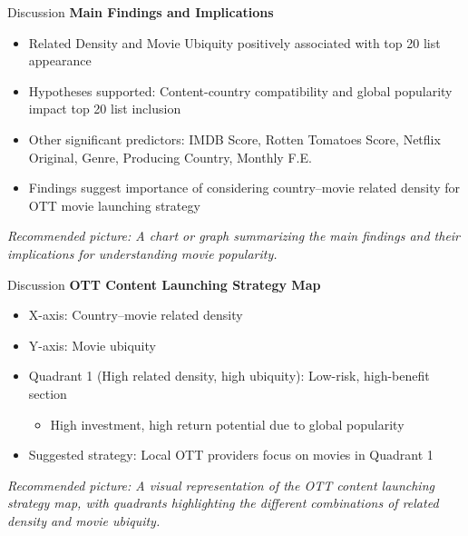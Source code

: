 \documentclass[
  ignorenonframetext,
]{beamer}
\providecommand{\tightlist}{%
  \setlength{\itemsep}{0pt}\setlength{\parskip}{0pt}}\usepackage{longtable,booktabs,array}
\begin{document}
\begin{frame}{Discussion}
\protect\hypertarget{discussion-1}{}
\textbf{Main Findings and Implications}

\begin{itemize}
\item
  Related Density and Movie Ubiquity positively associated with top 20
  list appearance
\item
  Hypotheses supported: Content-country compatibility and global
  popularity impact top 20 list inclusion
\item
  Other significant predictors: IMDB Score, Rotten Tomatoes Score,
  Netflix Original, Genre, Producing Country, Monthly F.E.
\item
  Findings suggest importance of considering country--movie related
  density for OTT movie launching strategy
\end{itemize}

\emph{Recommended picture: A chart or graph summarizing the main
findings and their implications for understanding movie popularity.}
\end{frame}

\begin{frame}{Discussion}
\protect\hypertarget{discussion-2}{}
\textbf{OTT Content Launching Strategy Map}

\begin{itemize}
\item
  X-axis: Country--movie related density
\item
  Y-axis: Movie ubiquity
\item
  Quadrant 1 (High related density, high ubiquity): Low-risk,
  high-benefit section

  \begin{itemize}
  \tightlist
  \item
    High investment, high return potential due to global popularity
  \end{itemize}
\item
  Suggested strategy: Local OTT providers focus on movies in Quadrant 1
\end{itemize}

\emph{Recommended picture: A visual representation of the OTT content
launching strategy map, with quadrants highlighting the different
combinations of related density and movie ubiquity.}
\end{frame}
\end{document}
